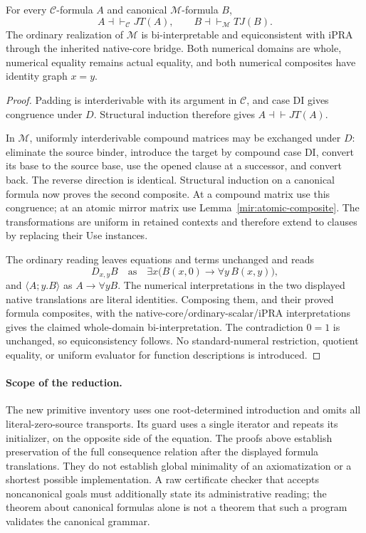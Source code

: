 \begin{theorem}
\label{mir:bi-interpretation}
For every $\mathcal C$-formula $A$ and canonical $\mathcal M$-formula $B$,
\[
 A\dashv\vdash_{\mathcal C}JT(A),\qquad
 B\dashv\vdash_{\mathcal M}TJ(B).
\]
The ordinary realization of $\mathcal M$ is bi-interpretable and
equiconsistent with iPRA through the inherited native-core bridge.
Both numerical domains are whole, numerical equality remains actual
equality, and both numerical composites have identity graph $x=y$.
\end{theorem}
\begin{proof}
Padding is interderivable with its argument in $\mathcal C$, and
case DI gives congruence under $D$. Structural induction therefore
gives $A\dashv\vdash JT(A)$.

In $\mathcal M$, uniformly interderivable compound matrices may be
exchanged under $D$: eliminate the source binder, introduce the
target by compound case DI, convert its base to the source base,
use the opened clause at a successor, and convert back. The reverse
direction is identical. Structural induction on a canonical formula
now proves the second composite. At a compound matrix use this
congruence; at an atomic mirror matrix use
Lemma~\ref{mir:atomic-composite}. The transformations are uniform in
retained contexts and therefore extend to clauses by replacing their
Use instances.

The ordinary reading leaves equations and terms unchanged and reads
\[
 D_{x,y}B\quad\text{as}\quad
 \exists x\bigl(B(x,0)\to\forall y\,B(x,y)\bigr),
\]
and $\langle A;y.B\rangle$ as $A\to\forall yB$. The numerical
interpretations in the two displayed native translations are literal
identities. Composing them, and their proved formula composites,
with the native-core/ordinary-scalar/iPRA interpretations gives the
claimed whole-domain bi-interpretation. The contradiction $0=1$
is unchanged, so equiconsistency follows. No standard-numeral
restriction, quotient equality, or uniform evaluator for function
descriptions is introduced.
\end{proof}

\paragraph{Scope of the reduction.}
The new primitive inventory uses one root-determined introduction and
omits all literal-zero-source transports. Its guard uses a single
iterator and repeats its initializer, on the opposite side of the
equation. The proofs above establish preservation of the full
consequence relation after the displayed formula translations. They
do not establish global minimality of an axiomatization or a shortest
possible implementation. A raw certificate checker that accepts
noncanonical goals must additionally state its administrative reading;
the theorem about canonical formulas alone is not a theorem that such
a program validates the canonical grammar.
